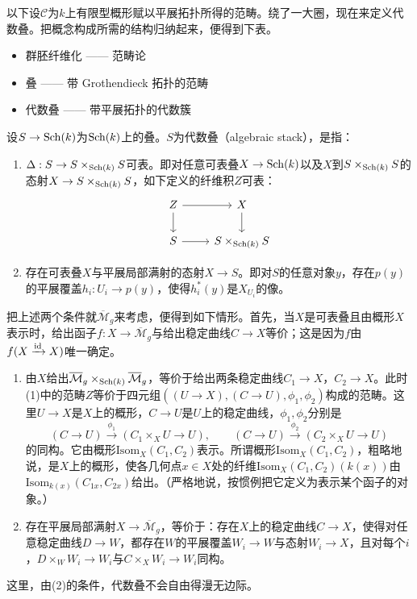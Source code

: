 以下设$\mathcal{C}$为$k$上有限型概形赋以平展拓扑所得的范畴。绕了一大圈，现在来定义代数叠。把概念构成所需的结构归纳起来，便得到下表。
\begin{itemize}[leftmargin=6em,itemsep=1pt,topsep=3pt]
\item 群胚纤维化 —— 范畴论
\item 叠 —— 带 Grothendieck 拓扑的范畴
\item 代数叠 —— 带平展拓扑的代数簇
\end{itemize}

\begin{definition}
设$S\to\operatorname{Sch}(k)$为$\operatorname{Sch}(k)$上的叠。$S$为代数叠（algebraic stack），是指：
\begin{enumerate}[label=(\arabic*)]
\item $\Delta:S\to S\times_{\operatorname{Sch}(k)}S$可表。即对任意可表叠$X\to\operatorname{Sch}(k)$以及$X$到$S\times_{\operatorname{Sch}(k)}S$的态射$X\to S\times_{\operatorname{Sch}(k)}S$，如下定义的纤维积$Z$可表：
\[
\begin{tikzcd}
Z \arrow[r] \arrow[d] & X \arrow[d] \\
S \arrow[r] & S\times_{\Sch(k)}S
\end{tikzcd}
\]
\item 存在可表叠$X$与平展局部满射的态射$X\to S$。即对$S$的任意对象$y$，存在$p(y)$的平展覆盖$h_i:U_i\to p(y)$，使得$h_i^*(y)$是$X_{U_i}$的像。
\end{enumerate}
\end{definition}

把上述两个条件就$\overline{\mathcal{M}}_g$来考虑，便得到如下情形。首先，当$X$是可表叠且由概形$X$表示时，给出函子$f:X\to\overline{\mathcal{M}}_g$与给出稳定曲线$C\to X$等价；这是因为$f$由$f(X\xrightarrow{\mathrm{id}}X)$唯一确定。

\begin{enumerate}[label=(\arabic*)]
\item 由$X$给出$\overline{\mathcal{M}}_g\times_{\operatorname{Sch}(k)}\overline{\mathcal{M}}_g$，等价于给出两条稳定曲线$C_1\to X$，$C_2\to X$。此时(1)中的范畴$Z$等价于四元组$((U\to X),(C\to U),\phi_1,\phi_2)$构成的范畴。这里$U\to X$是$X$上的概形，$C\to U$是$U$上的稳定曲线，$\phi_1,\phi_2$分别是
\[
(C\to U)\xrightarrow{\phi_1}(C_1\times_XU\to U),\qquad
(C\to U)\xrightarrow{\phi_2}(C_2\times_XU\to U)
\]
的同构。它由概形$\mathrm{Isom}_X(C_1,C_2)$表示。所谓概形$\mathrm{Isom}_X(C_1,C_2)$，粗略地说，是$X$上的概形，使各几何点$x\in X$处的纤维$\mathrm{Isom}_X(C_1,C_2)(k(x))$由$\mathrm{Isom}_{k(x)}(C_{1x},C_{2x})$给出。（严格地说，按惯例把它定义为表示某个函子的对象。）

\item 存在平展局部满射$X\to\overline{\mathcal{M}}_g$，等价于：存在$X$上的稳定曲线$C\to X$，使得对任意稳定曲线$D\to W$，都存在$W$的平展覆盖$W_i\to W$与态射$W_i\to X$，且对每个$i$，$D\times_WW_i\to W_i$与$C\times_XW_i\to W_i$同构。
\end{enumerate}

这里，由(2)的条件，代数叠不会自由得漫无边际。
